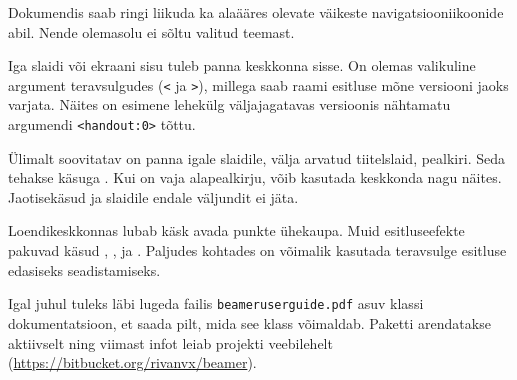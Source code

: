 Dokumendis saab ringi liikuda ka alaääres olevate väikeste
navigatsiooniikoonide abil. Nende olemasolu ei sõltu valitud teemast.

Iga slaidi või ekraani sisu tuleb panna keskkonna  sisse. On
olemas valikuline argument teravsulgudes (\verb|<| ja \verb|>|), millega
saab raami esitluse mõne versiooni jaoks varjata. Näites on esimene
lehekülg väljajagatavas versioonis nähtamatu argumendi
\verb|<handout:0>| tõttu.

Ülimalt soovitatav on panna igale slaidile, välja arvatud tiitelslaid,
pealkiri. Seda tehakse käsuga . Kui on vaja
alapealkirju, võib kasutada keskkonda  nagu näites.
Jaotisekäsud  ja  slaidile endale
väljundit ei jäta.

Loendikeskkonnas lubab käsk  avada punkte ühekaupa. Muid
esitluseefekte pakuvad käsud , , 
ja . Paljudes kohtades on võimalik kasutada teravsulge
esitluse edasiseks seadistamiseks.

Igal juhul tuleks läbi lugeda failis \texttt{beameruserguide.pdf} asuv
klassi \mbox{} dokumentatsioon, et saada pilt, mida see
klass võimaldab. Paketti arendatakse aktiivselt ning viimast infot leiab
projekti veebilehelt (\url{https://bitbucket.org/rivanvx/beamer}).

